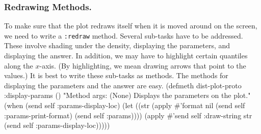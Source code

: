 \subsubsection{Redrawing Methods.}
\label{sec:distredrawing}
To make sure that the plot redraws itself when it is moved around on
the screen, we need to write a {\tt{}:redraw} method.  Several sub-tasks
have to be addressed. These involve shading under the density,
displaying the parameters, and displaying the answer. In addition, we
may have to highlight certain quantiles along the $x$-axis. (By
highlighting, we mean drawing arrows that point to the values.) It is
best to write these sub-tasks as methods. The methods for displaying
the parameters and the answer are easy.
\nwenddocs{}\plusendmoddef
(defmeth dist-plot-proto :display-params ()
  "Method args: (None)
Displays the parameters on the plot."
   (when (send self :params-display-loc)
      (let ((str (apply #'format nil (send self :params-print-format)
                        (send self :params))))
        (apply #'send self :draw-string str 
               (send self :params-display-loc)))))
\eatline
{}\nwendcode{}\nwdocspar
\nwenddocs{}\plusendmoddef
